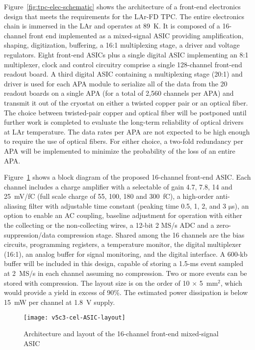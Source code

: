 Figure~\ref{fig:tpc-elec-schematic} shows the architecture of a front-end electronics
design that meets the requirements for the LAr-FD TPC. The entire
electronics chain is immersed in the LAr and operates at
89~K. It is composed of a 16-channel front end implemented as a
mixed-signal ASIC providing amplification, shaping, digitization,
buffering, a 16:1 multiplexing stage, a driver and voltage regulators.
Eight front-end ASICs plus a single digital ASIC implementing an
8:1 multiplexer, clock and control circuitry comprise a 
single 128-channel front-end readout board.  A third digital ASIC containing a
multiplexing stage (20:1) and driver is used for each APA module to serialize all of the data
from the 20 readout boards on a single APA (for a total of 2,560 channels per APA) and
transmit it out of the cryostat on either a twisted copper pair or an
optical fiber. The choice between twisted-pair copper and optical fiber will be
postponed until further work is completed to evaluate the long-term reliability
of optical drivers at LAr temperature. The data rates per APA
are not expected to be high enough to require the use of optical fibers.
For either choice, a two-fold redundancy per APA will be implemented
to minimize the probability of the loss of an entire APA.


Figure~\ref{fig:tpc-elec-asic-layout} shows a block diagram of the proposed 16-channel front-end
ASIC. Each channel includes a charge amplifier with a selectable of
gain 4.7, 7.8, 14 and 25~mV/fC (full scale charge of 55, 100, 180 and
300~fC), a high-order anti-aliasing filter with adjustable time
constant (peaking time 0.5, 1, 2, and 3 $\mathrm{\mu}$s), an option to enable an AC
coupling, baseline adjustment for operation with either the collecting
or the non-collecting wires, a 12-bit 2 MS/s ADC and a zero-suppression/data
compression stage. Shared among the 16 channels are the bias circuits,
programming registers, a temperature monitor, the digital multiplexer (16:1), an
analog buffer for signal monitoring, and the digital interface. A 600-kb 
buffer will be included in this design, capable of storing a 1.5-ms 
event sampled at 2~MS/s in each channel assuming no compression. Two or
more events can be stored with compression. The layout size is on the
order of 10 $\times$ 5~mm${^2}$, which would provide a
yield in excess of 90\%. The estimated power dissipation is below 15~mW
per channel at 1.8~V supply.

\begin{figure}[htbp]
\centering
\texttt{[image: v5c3-cel-ASIC-layout]}
\caption{Architecture and layout of the 16-channel front-end mixed-signal ASIC}
\label{fig:tpc-elec-asic-layout}
\end{figure}

